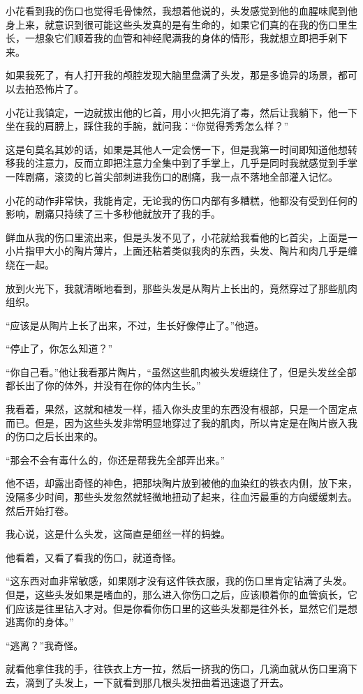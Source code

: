 小花看到我的伤口也觉得毛骨悚然，我想着他说的，头发感觉到他的血腥味爬到他身上来，就意识到很可能这些头发真的是有生命的，如果它们真的在我的伤口里生长，一想象它们顺着我的血管和神经爬满我的身体的情形，我就想立即把手剁下来。

如果我死了，有人打开我的颅腔发现大脑里盘满了头发，那是多诡异的场景，都可以去拍恐怖片了。

小花让我镇定，一边就拔出他的匕首，用小火把先消了毒，然后让我躺下，他一下坐在我的肩膀上，踩住我的手腕，就问我：“你觉得秀秀怎么样？”

这是句莫名其妙的话，如果是其他人一定会愣一下，但是我第一时间即知道他想转移我的注意力，反而立即把注意力全集中到了手掌上，几乎是同时我就感觉到手掌一阵剧痛，滚烫的匕首尖部刺进我伤口的剧痛，我一点不落地全部灌入记忆。

小花的动作非常快，我能肯定，无论我的伤口内部有多糟糕，他都没有受到任何的影响，剧痛只持续了三十多秒他就放开了我的手。

鲜血从我的伤口里流出来，但是头发不见了，小花就给我看他的匕首尖，上面是一小片指甲大小的陶片薄片，上面还粘着类似我肉的东西，头发、陶片和肉几乎是缠绕在一起。

放到火光下，我就清晰地看到，那些头发是从陶片上长出的，竟然穿过了那些肌肉组织。

“应该是从陶片上长了出来，不过，生长好像停止了。”他道。

“停止了，你怎么知道？”

“你自己看。”他让我看那片陶片，“虽然这些肌肉被头发缠绕住了，但是头发丝全部都长出了你的体外，并没有在你的体内生长。”

我看着，果然，这就和植发一样，插入你头皮里的东西没有根部，只是一个固定点而已。但是，因为这些头发非常明显地穿过了我的肌肉，所以肯定是在陶片嵌入我的伤口之后长出来的。

“那会不会有毒什么的，你还是帮我先全部弄出来。”

他不语，却露出奇怪的神色，把那块陶片放到被他的血染红的铁衣内侧，放下来，没隔多少时间，那些头发忽然就轻微地扭动了起来，往血污最重的方向缓缓刺去。然后开始打卷。

我心说，这是什么头发，这简直是细丝一样的蚂蝗。

他看着，又看了看我的伤口，就道奇怪。

“这东西对血非常敏感，如果刚才没有这件铁衣服，我的伤口里肯定钻满了头发。但是，这些头发如果是嗜血的，那么进入你伤口之后，应该顺着你的血管疯长，它们应该是往里钻入才对。但是你看你伤口里的这些头发都是往外长，显然它们是想逃离你的身体。”

“逃离？”我奇怪。

就看他拿住我的手，往铁衣上方一拉，然后一挤我的伤口，几滴血就从伤口里滴下去，滴到了头发上，一下就看到那几根头发扭曲着迅速退了开去。

